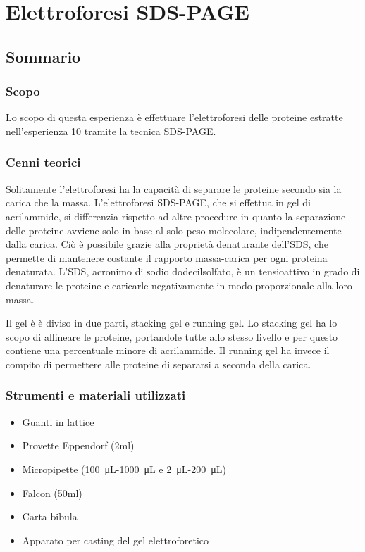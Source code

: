 \chapter{Elettroforesi SDS-PAGE}

\vspace{0.6cm}


\section{Sommario}

\subsection{Scopo}

Lo scopo di questa esperienza \`e effettuare l'elettroforesi
delle proteine estratte nell'esperienza 10 tramite la
tecnica SDS-PAGE.

\subsection{Cenni teorici}

Solitamente l'elettroforesi ha la capacit\`a di separare le proteine secondo sia
la carica che la massa.
L'elettroforesi SDS-PAGE, che si effettua in gel di acrilammide, si differenzia
rispetto ad altre procedure in quanto la separazione delle proteine
avviene solo in base al solo peso molecolare, indipendentemente dalla carica.
Ci\`o \`e possibile grazie alla propriet\`a denaturante dell'SDS,
che permette di mantenere costante il rapporto massa-carica per ogni proteina denaturata.
L'SDS, acronimo di sodio dodecilsolfato, \`e un tensioattivo in grado di denaturare le proteine e
caricarle negativamente in modo proporzionale alla loro massa.

Il gel \`e \`e diviso in due parti, stacking gel e running gel. Lo stacking gel
ha lo scopo di allineare le proteine, portandole tutte allo stesso livello e per
questo contiene una percentuale minore di acrilammide.
Il running gel ha invece il compito di permettere alle proteine di separarsi a
seconda della carica.

\subsection{Strumenti e materiali utilizzati}

\begin{itemize}
\item Guanti in lattice
\item Provette Eppendorf (2ml)
\item Micropipette (\SI{100}{\micro\liter}-\SI{1000}{\micro\liter} e \SI{2}{\micro\liter}-\SI{200}{\micro\liter})
\item Falcon (50ml)
\item Carta bibula
\item Apparato per casting del gel elettroforetico
\end{itemize}

